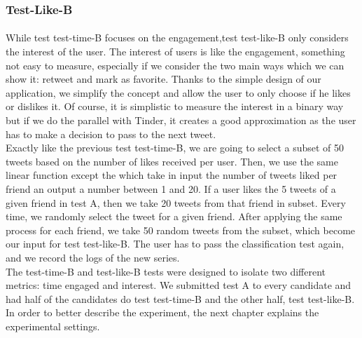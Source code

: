 \subsubsection{Test-Like-B}

\paragraph{}
While test test-time-B focuses on the engagement,test test-like-B only considers the interest of the user. The interest of users is like the engagement, something not easy to measure, especially if we consider the two main ways which we can show it: retweet and mark as favorite. Thanks to the simple design of our application, we simplify the concept and allow the user to only choose if he likes or dislikes it. Of course, it is simplistic to measure the interest in a binary way but if we do the parallel with Tinder, it creates a good approximation as the user has to make a decision to pass to the next tweet. \\
Exactly like the previous test test-time-B, we are going to select a subset of 50 tweets based on the number of likes received per user. Then, we use the same linear function except the  which take in input the number of tweets liked per friend an output a number between 1 and 20. If a user likes the 5 tweets of a given friend in test A, then we take 20 tweets from that friend in subset. Every time, we randomly select the tweet for a given friend. After applying the same process for each friend, we take 50 random tweets from the subset, which become our input for test test-like-B. The user has to pass the classification test again, and we record the logs of the new series. \\
The test-time-B and test-like-B tests were designed to isolate two different metrics: time engaged and interest. We submitted test A to every candidate and had half of the candidates do test test-time-B and the other half, test test-like-B. In order to better describe the experiment, the next chapter explains the experimental settings.